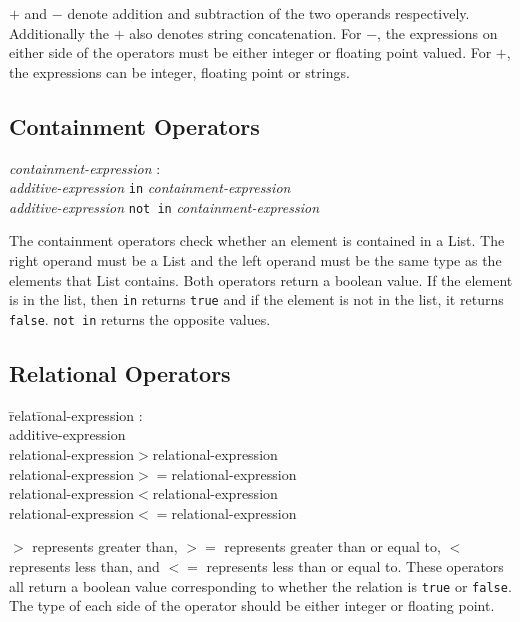 \documentclass{article}
\begin{document}
$+$ and $-$ denote addition and subtraction of the two operands respectively. Additionally the $+$ also denotes string concatenation. For $-$, the expressions on either side of the operators must be either integer or floating point valued. For $+$, the expressions can be integer, floating point or strings.

\subsection{Containment Operators}
\begin{tabbing}
	\= \emph{cont}\=\emph{ainment-expression} : \\
		\>\> \emph{additive-expression} \texttt{in} \emph{containment-expression} \\	
		\>\> \emph{additive-expression} \texttt{not in} \emph{containment-expression} 
\end{tabbing}
The containment operators check whether an element is contained in a List. The right operand must be a List and the left operand must be the same type as the elements that List contains. Both operators return a boolean value. If the element is in the list, then \texttt{in} returns \texttt{true} and if the element is not in the list, it returns \texttt{false}. \texttt{not in} returns the opposite values.

\subsection{Relational Operators}
\begin{itshape}
\begin{tabbing}
	\= relat\=ional-expression : \\
		\>\> additive-expression \\
		\>\> relational-expression$>$relational-expression \\		
		\>\> relational-expression$>=$relational-expression \\
		\>\> relational-expression$<$relational-expression \\
		\>\> relational-expression$<=$relational-expression 
\end{tabbing}
\end{itshape}

$>$ represents greater than, $>=$ represents greater than or equal to, $<$ represents less than, and $<=$ represents less than or equal to. These operators all return a boolean value corresponding to whether the relation is \texttt{true} or \texttt{false}. The type of each side of the operator should be either integer or floating point.
\end{document}
